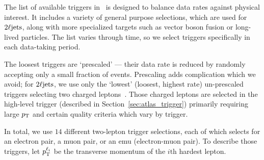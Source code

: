 The list of available triggers in \atlas\ is designed to balance data rates
against physical interest.
It includes a variety of general purpose selections, which are used for
$2\ell\mathrm{jets}$, along with more specialized targets such as vector boson fusion
or long-lived particles.
The list varies through time, so we select triggers specifically in
each data-taking period.

The loosest triggers are `prescaled' --- their data rate is reduced by randomly
accepting only a small fraction of events.
Prescaling adds complication which we avoid;
for $2\ell\mathrm{jets}$, we use only the `lowest' (loosest, highest rate) un-prescaled
triggers selecting two charged leptons~\cite{atlas_twiki_lowest_unprescaled}.
Those charged leptons are selected in the
high-level trigger (described in Section~\ref{sec:atlas_trigger})
primarily requiring large $p_\mathrm{T}$ and certain quality criteria which vary by
trigger.

In total, we use $14$ different two-lepton trigger selections, each of which
selects for an electron pair, a muon pair, or an emu (electron-muon pair).
To describe those triggers, let $p_\mathrm{T}^{\ell_i}$ be the transverse momentum of the
$i\mathrm{th}$ hardest lepton.

